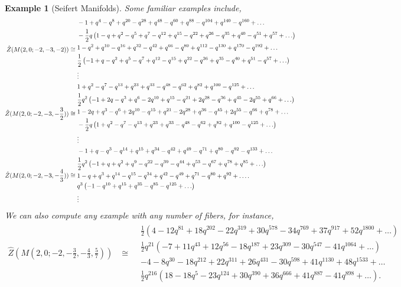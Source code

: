 \documentclass{article}
\newtheorem{example}{Example}[section]
\numberwithin{corollary}{theorem}
\numberwithin{corollary}{proposition}
\begin{document}
\begin{example}[Seifert Manifolds] Some familiar examples include, 
\begin{align*}
  \hat{Z}(M(2,0;-2,-3,-2)) & \cong \begin{aligned}
  &  -1+q^4-q^8+q^{20}-q^{28}+q^{48}-q^{60}+q^{88}-q^{104}+q^{140}-q^{160}+\ldots \\
& -\frac{1}{2} q \left(1-q+q^2-q^5+q^7-q^{12}+q^{15}-q^{22}+q^{26}-q^{35}+q^{40}-q^{51}+q^{57}+\ldots\right) \\
  & 1-q^2+q^{10}-q^{16}+q^{32}-q^{42}+q^{66}-q^{80}+q^{112}-q^{130}+q^{170}-q^{192}+\ldots \\
 & \frac{1}{2}  \left(-1+q-q^2+q^5-q^7+q^{12}-q^{15}+q^{22}-q^{26}+q^{35}-q^{40}+q^{51}-q^{57} +\ldots\right) \\ & \vdots
\end{aligned}   \endline
\hat{Z}(M(2,0;-2,-3,-\frac{3}{2})) &\cong \begin{aligned}
& 1+q^2-q^7-q^{13}+q^{23}+q^{33}-q^{48}-q^{62}+q^{82}+q^{100}-q^{125}+\ldots \\ 
  & \frac{1}{2} q^2 \left(-1+2 q-q^3+q^6-2 q^{10}+q^{15}-q^{21}+2 q^{28}-q^{36}+q^{45}-2 q^{55}+q^{66}+\ldots\right)\\
   & 1-2 q+q^3-q^6+2 q^{10}-q^{15}+q^{21}-2 q^{28}+q^{36}-q^{45}+2 q^{55}-q^{66}+q^{78}+\ldots\\
 &  -\frac{1}{2} q  \left(1+q^2-q^7-q^{13}+q^{23}+q^{33}-q^{48}-q^{62}+q^{82}+q^{100}-q^{125}+\ldots\right)\\  & \vdots 
   \end{aligned} \endline 
   \hat{Z}(M(2,0;-2,-3,-\frac{4}{3})) &\cong \begin{aligned}
& -1+q-q^3-q^{14}+q^{15}+q^{34}-q^{42}+q^{49}-q^{71}+q^{80}-q^{92}-q^{133}+\ldots\\
&   \frac{1}{2} q^2   \left(-1+q+q^2+q^9-q^{22}-q^{39}-q^{44}+q^{53}-q^{67}+q^{78}+q^{85}+\ldots\right)\\
&   1-q+q^3+q^{14}-q^{15}-q^{34}+q^{42}-q^{49}+q^{71}-q^{80}+q^{92}+\ldots.\\
&    q^3 \left(-1- q^{10}+ q^{15}+ q^{35}- q^{85}-   q^{125}+\ldots\right)\\ & \vdots \end{aligned}
\end{align*}
We can also compute any example with any number of fibers, for instance, 
\begin{align*}
    \hat{Z}(M(2,0;-2,-\frac{3}{2},-\frac{4}{3}, \frac{5}{7})) &\cong  \begin{aligned}
     &  \frac{1}{2} \left(4-12 q^{81}+18 q^{202}-22 q^{319}+30 q^{578}-34 q^{769}+37 q^{917}+52q^{1800}+\ldots\right) \\
 & \frac{1}{2} q^{21} \left(-7+11 q^{43}+12 q^{56}-18 q^{187}+23 q^{309}-30 q^{547}-41q^{1064}+\ldots\right) \\
& -4-8 q^{30}-18 q^{212}+22 q^{311}+26 q^{431}-30 q^{598}+41 q^{1130}+48q^{1533}+\ldots \\
& \frac{1}{2} q^{216} \left(18-18 q^5-23 q^{124}+30 q^{390}+36 q^{666}+41 q^{887}-41 q^{898}+\ldots\right). 
    \end{aligned}
\end{align*}
\end{example}
\end{document}
